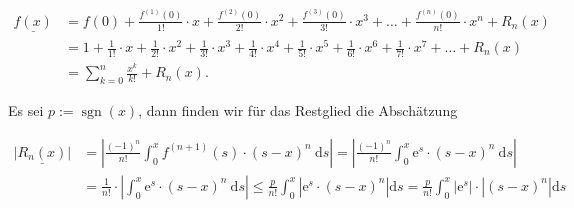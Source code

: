 \documentclass[10pt]{article}
\begin{document}
\begin{align*}
\underline{f(x)} & =f(0)+\frac{f^{(1)}(0)}{1!} \cdot x+\frac{f^{(2)}(0)}{2!} \cdot x^{2}+\frac{f^{(3)}(0)}{3!} \cdot x^{3}+\ldots+\frac{f^{(n)}(0)}{n!} \cdot x^{n}+R_{n}(x) \\
& =1+\frac{1}{1!} \cdot x+\frac{1}{2!} \cdot x^{2}+\frac{1}{3!} \cdot x^{3}+\frac{1}{4!} \cdot x^{4}+\frac{1}{5!} \cdot x^{5}+\frac{1}{6!} \cdot x^{6}+\frac{1}{7!} \cdot x^{7}+\ldots+R_{n}(x) \\
& =\sum_{k=0}^{n} \frac{x^{k}}{k!}+R_{n}(x) . \tag{4.13}
\end{align*}


Es sei $p:=\operatorname{sgn}(x)$, dann finden wir für das Restglied die Abschätzung

$$
\begin{aligned}
\underline{\left|R_{n}(x)\right|} & =\left|\frac{(-1)^{n}}{n!} \int_{0}^{x} f^{(n+1)}(s) \cdot(s-x)^{n} \mathrm{~d} s\right|=\left|\frac{(-1)^{n}}{n!} \int_{0}^{x} \mathrm{e}^{s} \cdot(s-x)^{n} \mathrm{~d} s\right| \\
& =\frac{1}{n!} \cdot\left|\int_{0}^{x} \mathrm{e}^{s} \cdot(s-x)^{n} \mathrm{~d} s\right| \leq \frac{p}{n!} \int_{0}^{x}\left|\mathrm{e}^{s} \cdot(s-x)^{n}\right| \mathrm{d} s=\frac{p}{n!} \int_{0}^{x}\left|\mathrm{e}^{s}\right| \cdot\left|(s-x)^{n}\right| \mathrm{d} s
\end{aligned}
$$
\end{document}

